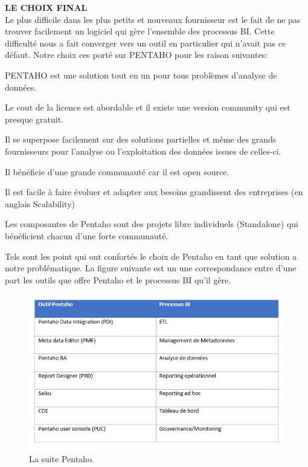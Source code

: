 \textbf{LE CHOIX FINAL}\\

Le plus difficile dans les plus petits et nouveaux fournisseur est le fait de ne pas trouver facilement un logiciel qui gère l’ensemble des processus BI. Cette difficulté nous a fait converger vers un outil en particulier qui n’avait pas ce défaut. Notre choix ces porté sur PENTAHO pour les raison suivantes:
\begin{list}{•}{ }
   \item PENTAHO est une solution tout en un pour tous problèmes d’analyse de données.
   \item Le cout de la licence est abordable et il existe une version community qui est presque gratuit.
   \item Il se superpose facilement sur des solutions partielles et même des grands fournisseurs pour l’analyse ou l’exploitation des données issues de celles-ci.
   \item Il bénéficie d’une grande communauté car il est open source.
   \item Il est facile à faire évoluer et adapter aux besoins grandissent des entreprises (en anglais Scalability)
   \item Les composantes de Pentaho sont des projets libre individuels (Standalone) qui bénéficient chacun d’une forte communauté.\\
\end{list}

Tels sont les point qui ont confortés le choix de Pentaho en tant que solution a notre problématique. La figure suivante est un une correspondance entre d’une part les outils que offre Pentaho et le processus BI qu’il gère.

\begin{figure}[!htbp]
	\begin{center}
		\includegraphics[scale=0.95]{images/tab_pentaho_tools.png}
		\caption{La suite Pentaho.}
		\label{use_bi_tools}
	\end{center}
\end{figure}



